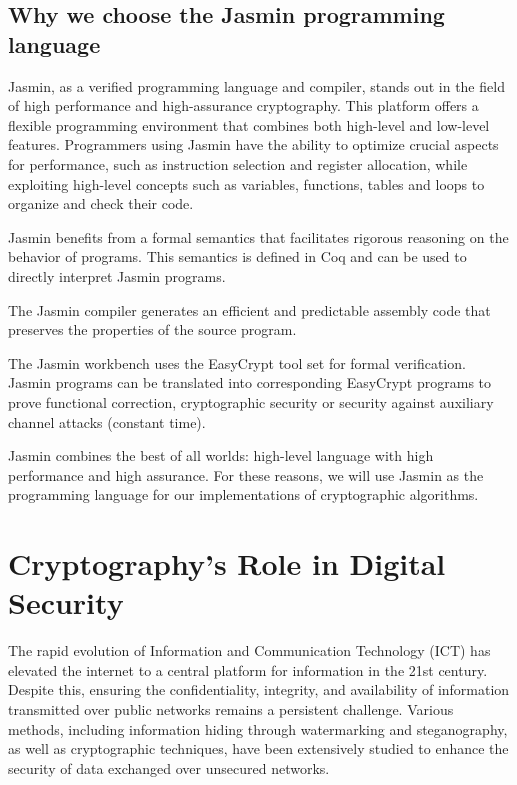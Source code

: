\documentclass[runningheads]{llncs}
\begin{document}
\subsection{Why we choose the Jasmin programming language}
Jasmin\cite{jasmin_paper}, as a verified programming language and compiler, stands out in the field of high performance and high-assurance cryptography. This platform offers a flexible programming environment that combines both high-level and low-level features. Programmers using Jasmin have the ability to optimize crucial aspects for performance, such as instruction selection and register allocation, while exploiting high-level concepts such as variables, functions, tables and loops to organize and check their code.

Jasmin benefits from a formal semantics that facilitates rigorous reasoning on the behavior of programs. This semantics is defined in Coq and can be used to directly interpret Jasmin programs.

The Jasmin compiler generates an efficient and predictable assembly code that preserves the properties of the source program.

The Jasmin workbench uses the EasyCrypt tool set for formal verification. Jasmin programs can be translated into corresponding EasyCrypt programs to prove functional correction, cryptographic security or security against auxiliary channel attacks (constant time).

Jasmin combines the best of all worlds: high-level language with high performance and high assurance. For these reasons, we will use Jasmin as the programming language for our implementations of cryptographic algorithms.



\section{Cryptography's Role in Digital Security}

The rapid evolution of Information and Communication Technology (ICT) has elevated the internet to a central platform for information in the 21st century. Despite this, ensuring the confidentiality, integrity, and availability of information transmitted over public networks remains a persistent challenge. Various methods, including information hiding through watermarking and steganography, as well as cryptographic techniques, have been extensively studied to enhance the security of data exchanged over unsecured networks.
\end{document}

